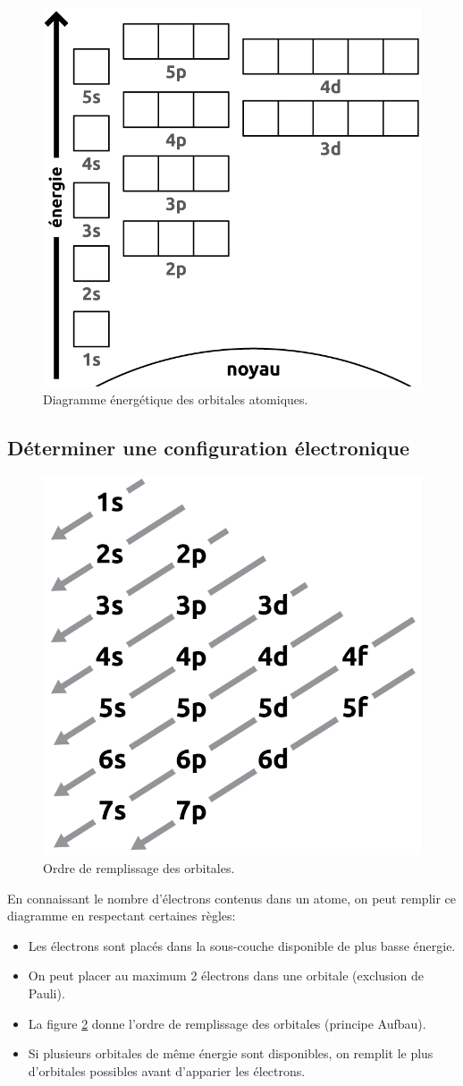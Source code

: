 \documentclass[
  11pt,
  a4paper,
  openany]{book}
\providecommand{\tightlist}{%
  \setlength{\itemsep}{0pt}\setlength{\parskip}{0pt}}
\begin{document}
\begin{figure}

{\centering \includegraphics[width=0.4\linewidth]{images/energy-level} 

}

\caption{Diagramme énergétique des orbitales atomiques.}\label{fig:energy-level}
\end{figure}

\subsection{Déterminer une configuration électronique}\label{duxe9terminer-une-configuration-uxe9lectronique}

\begin{figure}

{\centering \includegraphics[width=0.25\linewidth]{images/energy-level-order} 

}

\caption{Ordre de remplissage des orbitales.}\label{fig:energy-level-order}
\end{figure}

En connaissant le nombre d'électrons contenus dans un atome, on peut remplir ce diagramme en respectant certaines règles:

\begin{itemize}
\tightlist
\item
  Les électrons sont placés dans la sous-couche disponible de plus basse énergie.
\item
  On peut placer au maximum 2 électrons dans une orbitale (exclusion de Pauli).
\item
  La figure \ref{fig:energy-level-order} donne l'ordre de remplissage des orbitales (principe Aufbau).
\item
  Si plusieurs orbitales de même énergie sont disponibles, on remplit le plus d'orbitales possibles avant d'apparier les électrons.
\end{itemize}
\end{document}
